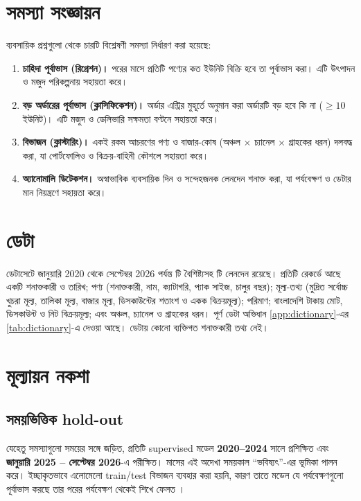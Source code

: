 \section{সমস্যা সংজ্ঞায়ন}
ব্যবসায়িক প্রশ্নগুলো থেকে চারটি বিশ্লেষণী সমস্যা নির্ধারণ করা হয়েছে:
\begin{enumerate}
  \item \textbf{চাহিদা পূর্বাভাস (রিগ্রেশন)।} পরের মাসে প্রতিটি পণ্যের কত ইউনিট বিক্রি হবে তা পূর্বাভাস করা। এটি উৎপাদন ও মজুদ
        পরিকল্পনায় সহায়তা করে।
  \item \textbf{বড় অর্ডারের পূর্বাভাস (ক্লাসিফিকেশন)।} অর্ডার এন্ট্রির মুহূর্তে অনুমান করা অর্ডারটি বড় হবে কি না (\(\geq 10\) ইউনিট)।
        এটি মজুদ ও ডেলিভারি সক্ষমতা বণ্টনে সহায়তা করে।
  \item \textbf{বিভাজন (ক্লাস্টারিং)।} একই রকম আচরণের পণ্য ও বাজার-কোষ (অঞ্চল $\times$ চ্যানেল $\times$ গ্রাহকের ধরন) দলবদ্ধ করা,
        যা পোর্টফোলিও ও বিক্রয়-বাহিনী কৌশলে সহায়তা করে।
  \item \textbf{অ্যানোমালি ডিটেকশন।} অস্বাভাবিক ব্যবসায়িক দিন ও সন্দেহজনক লেনদেন শনাক্ত করা, যা পর্যবেক্ষণ ও ডেটার মান নিয়ন্ত্রণে
        সহায়তা করে।
\end{enumerate}

\section{ডেটা}
ডেটাসেটে জানুয়ারি 2020 থেকে সেপ্টেম্বর 2026 পর্যন্ত \NCols টি বৈশিষ্ট্যসহ \NRows টি লেনদেন রয়েছে। প্রতিটি রেকর্ডে আছে একটি শনাক্তকারী ও
তারিখ; পণ্য (শনাক্তকারী, নাম, ক্যাটাগরি, প্যাক সাইজ, চালুর বছর); মূল্য-তথ্য (মুদ্রিত সর্বোচ্চ খুচরা মূল্য, তালিকা মূল্য, বাজার মূল্য,
ডিসকাউন্টের শতাংশ ও একক বিক্রয়মূল্য); পরিমাণ; বাংলাদেশি টাকায় মোট, ডিসকাউন্ট ও নিট বিক্রয়মূল্য; এবং অঞ্চল, চ্যানেল ও গ্রাহকের
ধরন। পূর্ণ ডেটা অভিধান \cref{app:dictionary}-এর \cref{tab:dictionary}-এ দেওয়া আছে। ডেটায় কোনো ব্যক্তিগত শনাক্তকারী তথ্য নেই।

\section{মূল্যায়ন নকশা}
\subsection{সময়ভিত্তিক hold-out}
যেহেতু সমস্যাগুলো সময়ের সঙ্গে জড়িত, প্রতিটি supervised মডেল \textbf{2020--2024} সালে প্রশিক্ষিত এবং \textbf{জানুয়ারি
2025 -- সেপ্টেম্বর 2026}-এ পরীক্ষিত। \TestMonths মাসের এই অদেখা সময়কাল ``ভবিষ্যৎ''-এর ভূমিকা পালন করে। ইচ্ছাকৃতভাবে
এলোমেলো train/test বিভাজন ব্যবহার করা হয়নি, কারণ তাতে মডেল যে পর্যবেক্ষণগুলো পূর্বাভাস করছে তার পরের পর্যবেক্ষণ থেকেই শিখে
ফেলত \citep{bergmeir2012}।

